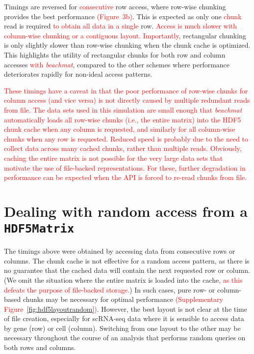 \documentclass{article}
\newcommand{\beachmat}{\textit{beachmat}}
\newcommand{\revised}[1]{\textcolor{red}{#1}}
\begin{document}
Timings are reversed for \revised{consecutive} row access, where row-wise chunking provides the best performance \revised{(Figure~3b)}.
This is expected as only one \revised{chunk} read is required \revised{to obtain all data in a single} row.
\revised{Access is much slower with column-wise chunking or a contiguous layout.
Importantly,} rectangular chunking is only slightly slower than row-wise chunking when the chunk cache is optimized.
This highlights the utility of rectangular chunks for both row and column accesses \revised{with \beachmat{}},
compared to the other schemes where performance deteriorates rapidly for non-ideal access patterns.

\revised{These timings have a caveat in that the poor performance of row-wise chunks for column access (and vice versa) is not directly caused by multiple redundant reads from file.
The data sets used in this simulation are small enough that \beachmat{} automatically loads all row-wise chunks (i.e., the entire matrix) into the HDF5 chunk cache when any column is requested, and similarly for all column-wise chunks when any row is requested.
Reduced speed is probably due to the need to collect data across many cached chunks, rather than multiple reads. 
Obviously, caching the entire matrix is not possible for the very large data sets that motivate the use of file-backed representations.
For these, further degradation in performance can be expected when the API is forced to re-read chunks from file.}


\section{Dealing with random access from a \texttt{HDF5Matrix}}
\label{sec:random}

The timings above were obtained by accessing data from consecutive rows or columns.
The chunk cache is not effective for a random access pattern, as there is no guarantee that the cached data will contain the next requested row or column.
(We omit the situation where the entire matrix is loaded into the cache\revised{, as this defeats the purpose of file-backed storage.})
In such cases, pure row- or column-based chunks may be necessary for optimal performance \revised{(Supplementary Figure~\ref{fig:hdf5layoutrandom})}.
However, the best layout is not clear at the time of file creation, especially for scRNA-seq data where it is sensible to access data by gene (row) or cell (column).
Switching from one layout to the other may be necessary throughout the course of an analysis that performs random queries on both rows and columns.
\end{document}
